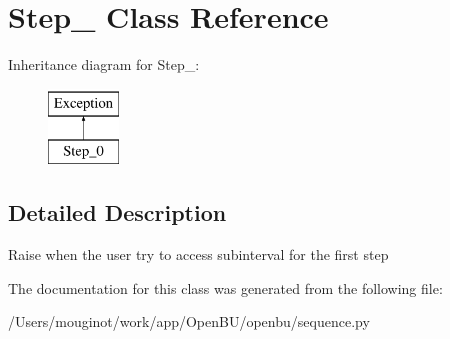\hypertarget{classopenbu_1_1sequence_1_1_step__0}{}\section{Step\+\_ Class Reference}
\label{classopenbu_1_1sequence_1_1_step__0}
Inheritance diagram for Step\+\_\+:\begin{figure}[H]
\begin{center}
\leavevmode
\includegraphics[height=2.000000cm]{classopenbu_1_1sequence_1_1_step__0}
\end{center}
\end{figure}


\subsection{Detailed Description}
\begin{DoxyVerb}Raise when the user try to access subinterval for the first step\end{DoxyVerb}
 

The documentation for this class was generated from the following file\+:\begin{DoxyCompactItemize}
\item 
/\+Users/mouginot/work/app/\+Open\+B\+U/openbu/sequence.\+py\end{DoxyCompactItemize}
